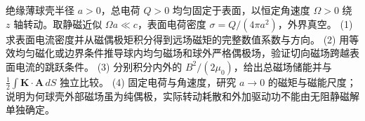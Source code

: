 绝缘薄球壳半径 \(a>0\)，总电荷 \(Q>0\) 均匀固定于表面，以恒定角速度 \(\Omega>0\) 绕 \(z\) 轴转动。取静磁近似 \(\Omega a\ll c\)，表面电荷密度 \(\sigma=Q/(4\pi a^2)\)，外界真空。
(1) 求表面电流密度并从磁偶极矩积分得到远场磁矩的完整数值系数与方向。
(2) 用等效均匀磁化或边界条件推导球内均匀磁场和球外严格偶极场，验证切向磁场跨越表面电流的跳跃条件。
(3) 分别积分内外的 \(B^2/(2\mu_0)\)，给出总磁场储能并与 \(\frac12\int\boldsymbol K\cdot\boldsymbol A\,dS\) 独立比较。
(4) 固定电荷与角速度，研究 \(a\to0\) 的磁矩与磁能尺度；说明为何球壳外部磁场虽为纯偶极，实际转动耗散和外加驱动功不能由无阻静磁解单独确定。
